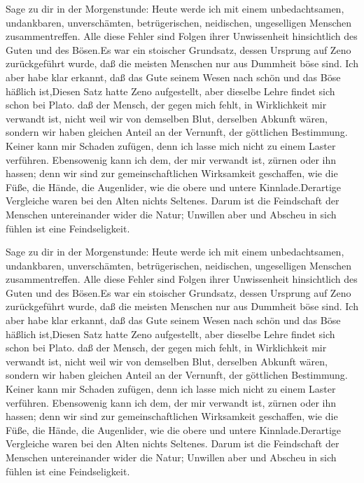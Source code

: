 \documentclass[12pt,ngerman,parskip=half]{scrartcl}
\begin{document}
Sage zu dir in der Morgenstunde: Heute werde ich mit einem unbedachtsamen, undankbaren, unverschämten, betrügerischen, neidischen, ungeselligen Menschen zusammentreffen. Alle diese Fehler sind Folgen ihrer Unwissenheit hinsichtlich des Guten und des Bösen.Es war ein stoischer Grundsatz, dessen Ursprung auf Zeno zurückgeführt wurde, daß die meisten Menschen nur aus Dummheit böse sind. Ich aber habe klar erkannt, daß das Gute seinem Wesen nach schön und das Böse häßlich ist,Diesen Satz hatte Zeno aufgestellt, aber dieselbe Lehre findet sich schon bei Plato. daß der Mensch, der gegen mich fehlt, in Wirklichkeit mir verwandt ist, nicht weil wir von demselben Blut, derselben Abkunft wären, sondern wir haben gleichen Anteil an der Vernunft, der göttlichen Bestimmung. Keiner kann mir Schaden zufügen, denn ich lasse mich nicht zu einem Laster verführen. Ebensowenig kann ich dem, der mir verwandt ist, zürnen oder ihn hassen; denn wir sind zur gemeinschaftlichen Wirksamkeit geschaffen, wie die Füße, die Hände, die Augenlider, wie die obere und untere Kinnlade.Derartige Vergleiche waren bei den Alten nichts Seltenes. Darum ist die Feindschaft der Menschen untereinander wider die Natur; Unwillen aber und Abscheu in sich fühlen ist eine Feindseligkeit.


Sage zu dir in der Morgenstunde: Heute werde ich mit einem unbedachtsamen, undankbaren, unverschämten, betrügerischen, neidischen, ungeselligen Menschen zusammentreffen. Alle diese Fehler sind Folgen ihrer Unwissenheit hinsichtlich des Guten und des Bösen.Es war ein stoischer Grundsatz, dessen Ursprung auf Zeno zurückgeführt wurde, daß die meisten Menschen nur aus Dummheit böse sind. Ich aber habe klar erkannt, daß das Gute seinem Wesen nach schön und das Böse häßlich ist,Diesen Satz hatte Zeno aufgestellt, aber dieselbe Lehre findet sich schon bei Plato. daß der Mensch, der gegen mich fehlt, in Wirklichkeit mir verwandt ist, nicht weil wir von demselben Blut, derselben Abkunft wären, sondern wir haben gleichen Anteil an der Vernunft, der göttlichen Bestimmung. Keiner kann mir Schaden zufügen, denn ich lasse mich nicht zu einem Laster verführen. Ebensowenig kann ich dem, der mir verwandt ist, zürnen oder ihn hassen; denn wir sind zur gemeinschaftlichen Wirksamkeit geschaffen, wie die Füße, die Hände, die Augenlider, wie die obere und untere Kinnlade.Derartige Vergleiche waren bei den Alten nichts Seltenes. Darum ist die Feindschaft der Menschen untereinander wider die Natur; Unwillen aber und Abscheu in sich fühlen ist eine Feindseligkeit.
\end{document}
